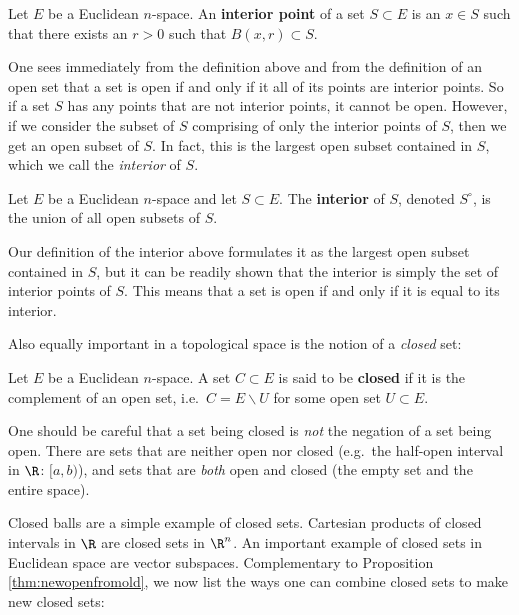 \begin{definition}
  Let \( E \) be a Euclidean \( n \)-space. An \textbf{interior point} of a set \( S\subset E \) is an \( x\in S \) such that there exists an \( r>0 \) such that \( B(x,r)\subset S \).
\end{definition}

One sees immediately from the definition above and from the definition of an open set that a set is open if and only if it all of its points are interior points. So if a set \( S \) has any points that are not interior points, it cannot be open. However, if we consider the subset of \( S \) comprising of only the interior points of \( S \), then we get an open subset of \( S \). In fact, this is the largest open subset contained in \( S \), which we call the \emph{interior} of \( S \).

\begin{definition}
  Let \( E \) be a Euclidean \( n \)-space and let \( S\subset E \). The \textbf{interior} of \( S \), denoted \( S^\circ \), is the union of all open subsets of \( S \).
\end{definition}

Our definition of the interior above formulates it as the largest open subset contained in \( S \), but it can be readily shown that the interior is simply the set of interior points of \( S \). This means that a set is open if and only if it is equal to its interior.

\vspace{3mm}

Also equally important in a topological space is the notion of a \emph{closed} set:

\begin{definition}
  Let \( E \) be a Euclidean \( n \)-space. A set \( C\subset E \) is said to be \textbf{closed} if it is the complement of an open set, i.e.\ \( C=E\backslash U \) for some open set \( U\subset E \).
\end{definition}

One should be careful that a set being closed is \emph{not} the negation of a set being open. There are sets that are neither open nor closed (e.g.\ the half-open interval in \( \R \): \( [a,b) \)), and sets that are \emph{both} open and closed (the empty set and the entire space).

\vspace{3mm}

Closed balls are a simple example of closed sets. Cartesian products of closed intervals in \( \R \) are closed sets in \( \R^n \). An important example of closed sets in Euclidean space are vector subspaces. Complementary to Proposition \ref{thm:newopenfromold}, we now list the ways one can combine closed sets to make new closed sets:

